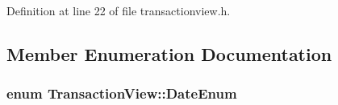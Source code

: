 Definition at line 22 of file transactionview.\+h.



\subsection{Member Enumeration Documentation}
\hypertarget{class_transaction_view_a73d1bbedc72fa131591aadb3aba150f8}{}
\subsubsection[{Date\+Enum}]{\setlength{\rightskip}{0pt plus 5cm}enum {\bf Transaction\+View\+::\+Date\+Enum}}\label{class_transaction_view_a73d1bbedc72fa131591aadb3aba150f8}
